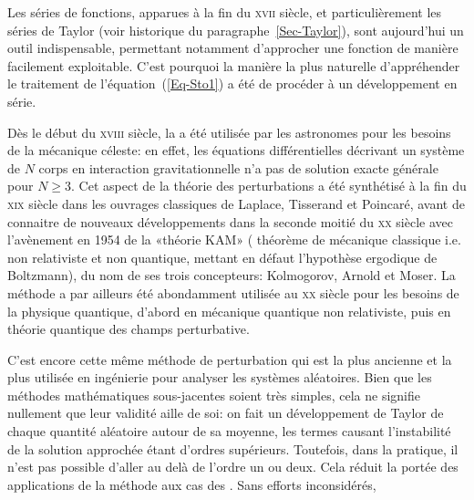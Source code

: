 \begin{histoire}
Les séries de fonctions, apparues à la fin du \textsc{xvii} siècle, et particulièrement les séries de Taylor (voir historique du paragraphe~\ref{Sec-Taylor}), sont aujourd'hui un outil indispensable, permettant notamment d'approcher une fonction de manière facilement exploitable.
C'est pourquoi la manière la plus naturelle d'appréhender le traitement de l'équation~(\ref{Eq-Sto1}) a été de procéder à un développement en série.

\medskip
Dès le début du \textsc{xviii} siècle, la  a été utilisée par les astronomes pour les besoins de la mécanique céleste: en effet, les équations différentielles décrivant un système de $N$ corps en interaction gravitationnelle n'a pas de solution exacte générale pour $N \ge 3$. Cet aspect de la théorie des perturbations a été synthétisé à la fin du \textsc{xix} siècle dans les ouvrages classiques de Laplace, Tisserand et Poincaré, avant de connaitre de nouveaux développements dans la seconde moitié du \textsc{xx} siècle avec l'avènement en 1954 de la «théorie KAM» ( théorème de mécanique classique i.e. non relativiste et non quantique, mettant en défaut l'hypothèse ergodique de Boltzmann), du nom de ses trois concepteurs: Kolmogorov, Arnold et Moser. La méthode a par ailleurs été abondamment utilisée au \textsc{xx} siècle pour les besoins de la physique quantique, d'abord en mécanique quantique non relativiste, puis en théorie quantique des champs perturbative.

\medskip
C'est encore cette même méthode de perturbation qui est la plus ancienne et la plus utilisée en ingénierie pour analyser les systèmes aléatoires.
Bien que les méthodes mathématiques sous-jacentes soient très simples, cela ne signifie nullement que leur validité aille de soi: on fait un développement de Taylor de chaque quantité aléatoire autour de sa moyenne, les termes causant l'instabilité de la solution approchée étant d'ordres supérieurs. Toutefois, dans la pratique, il n'est pas possible d'aller au delà de l'ordre un ou deux. Cela réduit la portée des applications de la méthode aux cas des . Sans efforts inconsidérés, 


\end{histoire}
